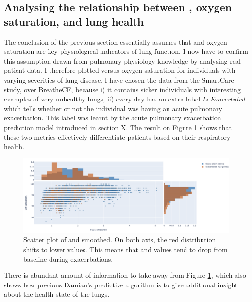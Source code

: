 \subsection{Analysing the relationship between \F, oxygen saturation, and lung health}
The conclusion of the previous section essentially assumes that \F and oxygen saturation are key physiological indicators of lung function. I now have to confirm this assumption drawn from pulmonary physiology knowledge by analysing real patient data. I therefore plotted \F versus oxygen saturation for individuals with varying severities of lung disease. I have chosen the data from the SmartCare study, over BreatheCF, because i) it contains sicker individuals with interesting examples of very unhealthy lungs, ii) every day has an extra label \textit{Is Exacerbated} which tells whether or not the individual was having an acute pulmonary exacerbation. This label was learnt by the acute pulmonary exacerbation prediction model introduced in section X. The result on Figure \ref{fig:o2_fev1_exacerbated} shows that these two metrics effectively differentiate patients based on their respiratory health. 

\begin{figure}[!h]
    \centering
    \includegraphics[width=150mm]{Chapter1/Figs/o2_fev1_with_exacerbated_labels.png}
    \caption{Scatter plot of \OXSat and \F smoothed. On both axis, the red distribution shifts to lower values. This means that \OXSat and \F values tend to drop from baseline during exacerbations.}
    \label{fig:o2_fev1_exacerbated}
\end{figure}

There is abundant amount of information to take away from Figure \ref{fig:o2_fev1_exacerbated}, which also shows how precious Damian's predictive algorithm is to give additional insight about the health state of the lungs.

